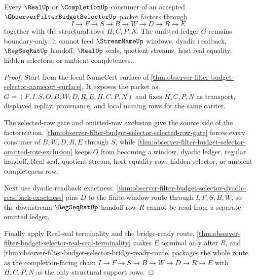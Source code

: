\begin{theorem}
\label{thm:observer-filter-budget-selector-completion-consumer-factorization}
Every $\RealUp$ or $\CompletionUp$ consumer of an accepted $\ObserverFilterBudgetSelectorUp$ packet factors through
$$
I \to F \to S \to B \to W \to D \to R \to E
$$
together with the structural rows $H,C,P,N$. The omitted ledger $O$ remains boundary-only: it cannot feed $\StreamNameUp$ windows, dyadic readback, $\RegSeqRatUp$ handoff, $\RealUp$ seals, quotient streams, host real equality, hidden selectors, or ambient completeness.
\end{theorem}
\begin{proof}
Start from the local NameCert surface of \autoref{thm:observer-filter-budget-selector-namecert-surface}. It exposes the packet as $G=(F,I,S,O,B,W,D,R,E,H,C,P,N)$ and fixes $H,C,P,N$ as transport, displayed replay, provenance, and local naming rows for the same carrier.

The selected-row gate and omitted-row exclusion give the source side of the factorization. \autoref{thm:observer-filter-budget-selector-selected-row-gate} forces every consumer of $B,W,D,R,E$ through $S$, while \autoref{thm:observer-filter-budget-selector-omitted-row-exclusion} keeps $O$ from becoming a window, dyadic ledger, regular handoff, Real seal, quotient stream, host equality row, hidden selector, or ambient completeness row.

Next use dyadic readback exactness. \autoref{thm:observer-filter-budget-selector-dyadic-readback-exactness} pins $D$ to the finite-window route through $I,F,S,B,W$, so the downstream $\RegSeqRatUp$ handoff row $R$ cannot be read from a separate omitted ledger.

Finally apply Real-seal terminality and the bridge-ready route. \autoref{thm:observer-filter-budget-selector-real-seal-terminality} makes $E$ terminal only after $R$, and \autoref{thm:observer-filter-budget-selector-bridge-ready-route} packages the whole route as the completion-facing chain $I \to F \to S \to B \to W \to D \to R \to E$ with $H,C,P,N$ as the only structural support rows.
\end{proof}

